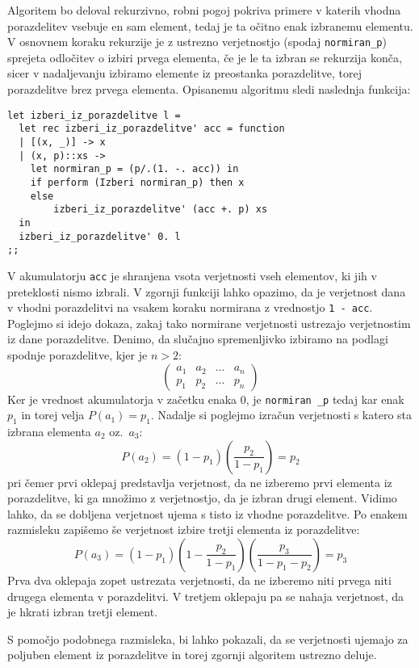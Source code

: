 \documentclass[a4paper,12pt]{article}
\theoremstyle{definition} %
\begin{document}
Algoritem bo deloval rekurzivno, robni pogoj pokriva primere v katerih vhodna porazdelitev vsebuje en sam element, tedaj je ta očitno enak izbranemu elementu. V osnovnem koraku rekurzije je z ustrezno verjetnostjo (spodaj \lstinline{normiran_p}) sprejeta odločitev o izbiri prvega elementa, če je le ta izbran se rekurzija konča, sicer v nadaljevanju izbiramo elemente  iz preostanka porazdelitve, torej porazdelitve brez prvega elementa. Opisanemu algoritmu sledi naslednja funkcija:
\begin{lstlisting}
let izberi_iz_porazdelitve l =
  let rec izberi_iz_porazdelitve' acc = function
  | [(x, _)] -> x
  | (x, p)::xs ->
    let normiran_p = (p/.(1. -. acc)) in
    if perform (Izberi normiran_p) then x 
    else 
    	izberi_iz_porazdelitve' (acc +. p) xs
  in
  izberi_iz_porazdelitve' 0. l
;;
\end{lstlisting}
V akumulatorju \lstinline{acc} je shranjena vsota verjetnosti vseh elementov, ki jih v preteklosti nismo izbrali. V zgornji funkciji lahko opazimo, da je verjetnost dana v vhodni porazdelitvi na vsakem koraku normirana z vrednostjo \lstinline{1 - acc}. Poglejmo si idejo dokaza, zakaj tako normirane verjetnosti ustrezajo verjetnostim iz dane porazdelitve. Denimo, da slučajno spremenljivko izbiramo na podlagi spodnje porazdelitve, kjer je $n > 2$:
\[ \left( \begin{array}{cccc}
a_1 & a_2 & \dots & a_n \\
p_1 & p_2 & \dots & p_n  \end{array} \right)\]
Ker je vrednost akumulatorja v začetku enaka 0, je \lstinline{normiran _p} tedaj kar enak $p_1$ in torej velja $P(a_1) = p_1$. Nadalje si poglejmo izračun verjetnosti s katero sta izbrana elementa $a_2$ oz.\ $a_3$:
$$
P(a_2) = (1 - p_1)( \frac{p_2}{1 - p_1}) = p_2 
$$
pri čemer prvi oklepaj predstavlja verjetnost, da ne izberemo prvi elementa iz porazdelitve, ki ga množimo z verjetnostjo, da je izbran drugi element. Vidimo lahko, da se dobljena verjetnost ujema s tisto iz vhodne porazdelitve. Po enakem razmisleku zapišemo še verjetnost izbire tretji elementa iz porazdelitve:
$$
P(a_3) = (1 - p_1) ( 1 - \frac{p_2}{1 - p_1}) ( \frac{p_3}{1 - p_1 - p_2}) = p_3 
$$
Prva dva oklepaja zopet ustrezata verjetnosti, da ne izberemo niti prvega niti drugega elementa v porazdelitvi. V tretjem oklepaju pa se nahaja verjetnost, da je hkrati izbran tretji element. 

S pomočjo podobnega razmisleka, bi lahko pokazali, da se verjetnosti ujemajo za poljuben element iz porazdelitve in torej zgornji algoritem ustrezno deluje. 
\end{document}
